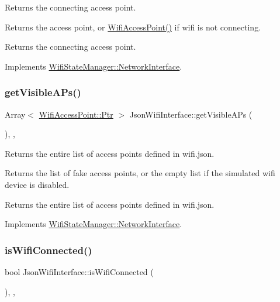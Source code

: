 Returns the connecting access point.

\begin{DoxyReturn}{Returns}
the access point, or \mbox{\hyperlink{classWifiAccessPoint}{Wifi\+Access\+Point()}} if wifi is not connecting.
\end{DoxyReturn}
Returns the connecting access point. 

Implements \mbox{\hyperlink{classWifiStateManager_1_1NetworkInterface_abff4fdeee0026c367dccc03828a88cc2}{Wifi\+State\+Manager\+::\+Network\+Interface}}.

\mbox{\label{classJsonWifiInterface_aaf538e8120fad2c6a861de5ef9c01543}} 
\subsubsection{\texorpdfstring{get\+Visible\+A\+Ps()}{getVisibleAPs()}}
{\footnotesize\ttfamily Array$<$ \mbox{\hyperlink{classWifiAccessPoint_ad18977f884076774803027efbaa131a0}{Wifi\+Access\+Point\+::\+Ptr}} $>$ Json\+Wifi\+Interface\+::get\+Visible\+A\+Ps (\begin{DoxyParamCaption}{ }\end{DoxyParamCaption})\hspace{0.3cm}{\ttfamily [override]}, {\ttfamily [protected]}, {\ttfamily [virtual]}}

Returns the entire list of access points defined in wifi.\+json.

\begin{DoxyReturn}{Returns}
the list of fake access points, or the empty list if the simulated wifi device is disabled.
\end{DoxyReturn}
Returns the entire list of access points defined in wifi.\+json. 

Implements \mbox{\hyperlink{classWifiStateManager_1_1NetworkInterface_a898004009e9645ad96a777ca2ee6a245}{Wifi\+State\+Manager\+::\+Network\+Interface}}.

\mbox{\label{classJsonWifiInterface_abd6d4e6e67e47a13560263e96e644131}} 
\subsubsection{\texorpdfstring{is\+Wifi\+Connected()}{isWifiConnected()}}
{\footnotesize\ttfamily bool Json\+Wifi\+Interface\+::is\+Wifi\+Connected (\begin{DoxyParamCaption}{ }\end{DoxyParamCaption})\hspace{0.3cm}{\ttfamily [override]}, {\ttfamily [protected]}, {\ttfamily [virtual]}}

